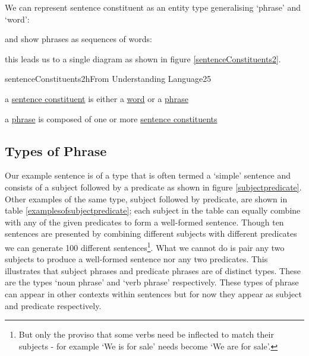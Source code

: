 \noindent We can represent sentence constituent as an entity type generalising `phrase' and `word': \\

\begin{center}

\end{center}

\noindent and show phrases as sequences of words:

\begin{center}

\end{center}

\noindent this leads us to a single diagram as shown in  figure \ref{sentenceConstituents2}.   \\

\begin{erbulletedDimFig}{sentenceConstituents2}{h}{From Understanding Language}{2}{5}
\item{a \underline{sentence constituent} is either a \underline{word} or a \underline{phrase}}
\vspace{0.5cm}
\item{a \underline{phrase} is composed of one or more \underline{sentence constituents}}
\end{erbulletedDimFig}


\subsection{Types of Phrase}

Our example sentence is of a type that is often termed a `simple' sentence and consists of a subject followed by a predicate as shown in figure \ref {subjectpredicate}. Other examples of the same type, subject followed by predicate, are shown in table \ref{examplesofsubjectpredicate};
each subject in the table can equally combine with any of the given predicates to form a well-formed sentence. Though ten sentences are presented by combining different subjects with different predicates we can generate 100 different sentences\footnote{But only the proviso that some verbs need be inflected to match their subjects - for example `We is for sale' needs become `We are for sale'.}. What we cannot do is pair any two subjects to produce a well-formed sentence nor any two predicates. This illustrates that subject phrases and predicate phrases are of distinct types. These are the types `noun phrase' and `verb phrase' respectively. These types of phrase can appear in other contexts within sentences but for now they appear as subject and predicate respectively.
\\

